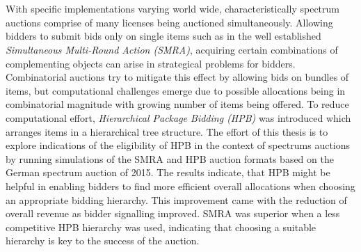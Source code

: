 \chapter{\abstractname}

With specific implementations varying world wide, characteristically spectrum auctions comprise of many licenses being auctioned simultaneously. Allowing bidders to submit bids only on single items such as in the well established \textit{Simultaneous Multi-Round Action (SMRA)}, acquiring certain combinations of complementing objects can arise in strategical problems for bidders. Combinatorial auctions try to mitigate this effect by allowing bids on bundles of items, but computational challenges emerge due to possible allocations being in combinatorial magnitude with growing number of items being offered. To reduce computational effort,\textit{ Hierarchical Package Bidding (HPB)} was introduced which arranges items in a hierarchical tree structure.
The effort of this thesis is to explore indications of the eligibility of HPB in the context of spectrums auctions by running simulations of the SMRA and HPB auction formats based on the German spectrum auction of 2015. The results indicate, that HPB might be helpful in enabling bidders to find more efficient overall allocations when choosing an appropriate bidding hierarchy. This improvement came with the reduction of overall revenue as bidder signalling improved. SMRA was superior when a less competitive HPB hierarchy was used, indicating that choosing a suitable hierarchy is key to the success of the auction. 

\newpage
